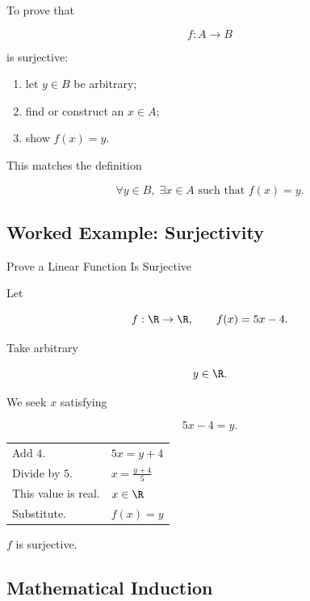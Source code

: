 To prove that

\[ f:A\to B \]

is surjective:

\begin{enumerate}
    \item let \(y\in B\) be arbitrary;
    \item find or construct an \(x\in A\);
    \item show \(f(x)=y\).
\end{enumerate}

This matches the definition

\[ \forall y\in B,\;\exists x\in A\text{ such that }f(x)=y. \]

\subsection{Worked Example: Surjectivity}
\label{subsec:worked-proof-surjectivity}

\begin{workedexamplebox}{Prove a Linear Function Is Surjective}

Let

\[ f:\R\to\R,\qquad f(x)=5x-4. \]

Take arbitrary

\[ y\in\R. \]

We seek \(x\) satisfying

\[ 5x-4=y. \]

\begin{tabularx}{\textwidth}{@{}>{\raggedright\arraybackslash}p{}X@{}}
Add \(4\). & \(5x=y+4\)\\
Divide by \(5\). & \(x=\frac{y+4}{5}\)\\
This value is real. & \(x\in\R\)\\
Substitute. & \(f(x)=y\)
\end{tabularx}

\begin{answerbox}
\(f\) is surjective.
\end{answerbox}
\end{workedexamplebox}

\subsection{Mathematical Induction}
\label{subsec:mathematical-induction}

